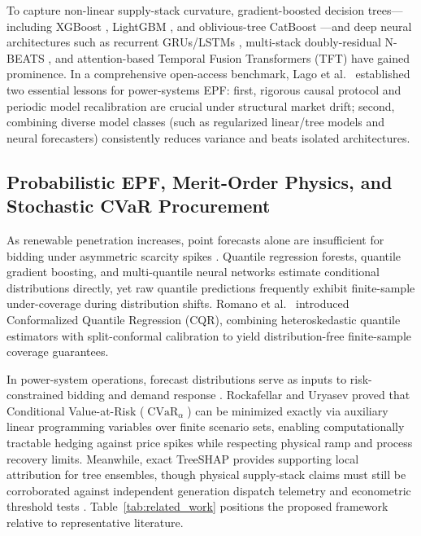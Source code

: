 \documentclass[journal,10pt,twocolumn]{IEEEtran}
\begin{document}
To capture non-linear supply-stack curvature, gradient-boosted decision trees---including XGBoost \cite{chen2016xgboost}, LightGBM \cite{ke2017lightgbm}, and oblivious-tree CatBoost \cite{prokhorenkova2018catboost}---and deep neural architectures such as recurrent GRUs/LSTMs \cite{ugurlu2018electricity}, multi-stack doubly-residual N-BEATS \cite{oreshkin2020nbeats}, and attention-based Temporal Fusion Transformers (TFT) \cite{lim2021temporal} have gained prominence. In a comprehensive open-access benchmark, Lago et al.~\cite{lago2021forecasting} established two essential lessons for power-systems EPF: first, rigorous causal protocol and periodic model recalibration are crucial under structural market drift; second, combining diverse model classes (such as regularized linear/tree models and neural forecasters) consistently reduces variance and beats isolated architectures.

\subsection{Probabilistic EPF, Merit-Order Physics, and Stochastic CVaR Procurement}
As renewable penetration increases, point forecasts alone are insufficient for bidding under asymmetric scarcity spikes \cite{nowotarski2018recent}. Quantile regression forests, quantile gradient boosting, and multi-quantile neural networks estimate conditional distributions directly, yet raw quantile predictions frequently exhibit finite-sample under-coverage during distribution shifts. Romano et al.~\cite{romano2019conformalized} introduced Conformalized Quantile Regression (CQR), combining heteroskedastic quantile estimators with split-conformal calibration to yield distribution-free finite-sample coverage guarantees.

In power-system operations, forecast distributions serve as inputs to risk-constrained bidding and demand response \cite{conejo2010decision}. Rockafellar and Uryasev \cite{rockafellar2000optimization} proved that Conditional Value-at-Risk ($\operatorname{CVaR}_{\alpha}$) can be minimized exactly via auxiliary linear programming variables over finite scenario sets, enabling computationally tractable hedging against price spikes while respecting physical ramp and process recovery limits. Meanwhile, exact TreeSHAP \cite{lundberg2020local} provides supporting local attribution for tree ensembles, though physical supply-stack claims must still be corroborated against independent generation dispatch telemetry and econometric threshold tests \cite{hansen2000sample}. Table~\ref{tab:related_work} positions the proposed framework relative to representative literature.
\end{document}
